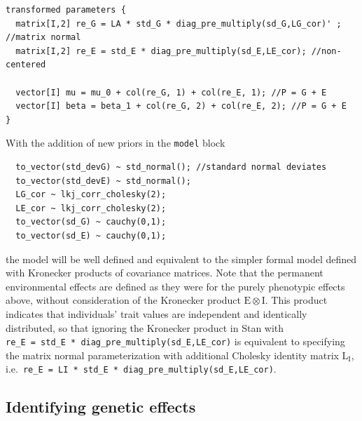 \documentclass[
]{book}
\begin{document}
\begin{verbatim}
transformed parameters {
  matrix[I,2] re_G = LA * std_G * diag_pre_multiply(sd_G,LG_cor)' ; //matrix normal
  matrix[I,2] re_E = std_E * diag_pre_multiply(sd_E,LE_cor); //non-centered
  
  vector[I] mu = mu_0 + col(re_G, 1) + col(re_E, 1); //P = G + E
  vector[I] beta = beta_1 + col(re_G, 2) + col(re_E, 2); //P = G + E
}
\end{verbatim}

With the addition of new priors in the \texttt{model} block

\begin{verbatim}
  to_vector(std_devG) ~ std_normal(); //standard normal deviates
  to_vector(std_devE) ~ std_normal();
  LG_cor ~ lkj_corr_cholesky(2);
  LE_cor ~ lkj_corr_cholesky(2);
  to_vector(sd_G) ~ cauchy(0,1);
  to_vector(sd_E) ~ cauchy(0,1);
\end{verbatim}

the model will be well defined and equivalent to the simpler formal model defined with Kronecker products of covariance matrices. Note that the permanent environmental effects are defined as they were for the purely phenotypic effects above, without consideration of the Kronecker product \(\boldsymbol{\mathrm{E}}\otimes\boldsymbol{\mathrm{I}}\). This product indicates that individuals' trait values are independent and identically distributed, so that ignoring the Kronecker product in Stan with \texttt{re\_E\ =\ std\_E\ *\ diag\_pre\_multiply(sd\_E,LE\_cor)} is equivalent to specifying the matrix normal parameterization with additional Cholesky identity matrix \(\boldsymbol{\mathrm{L_{I}}}\), i.e.~\texttt{re\_E\ =\ LI\ *\ std\_E\ *\ diag\_pre\_multiply(sd\_E,LE\_cor)\textquotesingle{}}.

\hypertarget{identifying-genetic-effects}{%
\subsection{Identifying genetic effects}\label{identifying-genetic-effects}}
\end{document}

